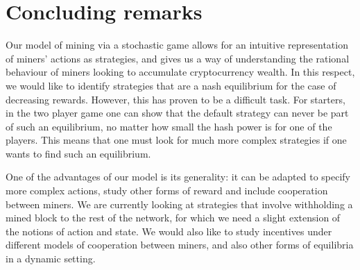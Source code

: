 \section{Concluding remarks}
\label{sec-con-r}

Our model of mining via a stochastic game allows for an intuitive representation of miners' actions as strategies, 
and gives us a way of understanding the rational behaviour of miners looking to accumulate cryptocurrency wealth. 
In this respect, we would like to identify strategies that are a nash equilibrium for the case of decreasing rewards. However, this has proven 
to be a difficult task. For starters, in the two player game one can show that the default strategy can never be part of such an 
equilibrium, no matter how small the hash power is for one of the players. This means that one must look for much more complex strategies if one 
wants to find such an equilibrium. 

One of the advantages of our model is its generality: it can be adapted to specify more complex 
actions, study other forms of reward and include cooperation between miners. 
We are currently looking at strategies that involve withholding 
a mined block to the rest of the network, for which we need a slight extension of the notions of action and state. 
We would also like to study incentives under different models of cooperation between miners, and 
also other forms of equilibria in a dynamic setting. 

